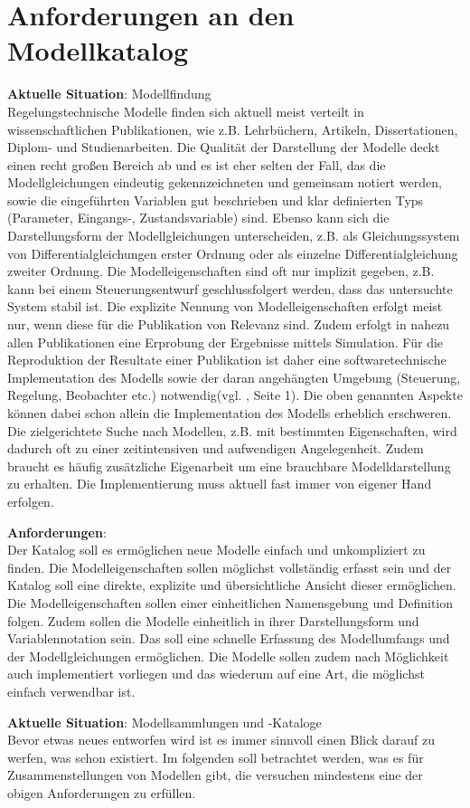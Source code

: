 \section{Anforderungen an den Modellkatalog}
\textbf{Aktuelle Situation}: Modellfindung \\
Regelungstechnische Modelle finden sich aktuell meist verteilt in wissenschaftlichen Publikationen, wie z.B. Lehrbüchern, Artikeln, Dissertationen, Diplom- und Studienarbeiten. Die Qualität der Darstellung der Modelle deckt einen recht großen Bereich ab und es ist eher selten der Fall, das die Modellgleichungen eindeutig gekennzeichneten und gemeinsam notiert werden, sowie die eingeführten Variablen gut beschrieben und klar definierten Typs (Parameter, Eingangs-, Zustandsvariable) sind. Ebenso kann sich die Darstellungsform der Modellgleichungen unterscheiden, z.B. als Gleichungssystem von Differentialgleichungen erster Ordnung oder als einzelne Differentialgleichung zweiter Ordnung. Die Modelleigenschaften sind oft nur implizit gegeben, z.B. kann bei einem Steuerungsentwurf geschlussfolgert werden, dass das untersuchte System stabil ist. Die explizite Nennung von Modelleigenschaften erfolgt meist nur, wenn diese für die Publikation von Relevanz sind. Zudem erfolgt in nahezu allen Publikationen eine Erprobung der Ergebnisse mittels Simulation. Für die Reproduktion der Resultate einer Publikation ist daher eine softwaretechnische Implementation des Modells sowie der daran angehängten Umgebung (Steuerung, Regelung, Beobachter etc.) notwendig(vgl. \cite{KNHE20}, Seite 1). Die oben genannten Aspekte können dabei schon allein die Implementation des Modells erheblich erschweren. 
Die zielgerichtete Suche nach Modellen, z.B. mit bestimmten Eigenschaften, wird dadurch oft zu einer zeitintensiven und aufwendigen Angelegenheit. Zudem braucht es häufig zusätzliche Eigenarbeit um eine brauchbare Modelldarstellung zu erhalten. Die Implementierung muss aktuell fast immer von eigener Hand erfolgen.

\textbf{Anforderungen}:\\ %
Der Katalog soll es ermöglichen neue Modelle einfach und unkompliziert zu finden. Die Modelleigenschaften sollen möglichst vollständig erfasst sein und der Katalog soll eine direkte, explizite und übersichtliche Ansicht dieser ermöglichen. Die Modelleigenschaften sollen einer einheitlichen Namensgebung und Definition folgen. Zudem sollen die Modelle einheitlich in ihrer Darstellungsform und Variablennotation sein. Das soll eine schnelle Erfassung des Modellumfangs und der Modellgleichungen ermöglichen. Die Modelle sollen zudem nach Möglichkeit auch implementiert vorliegen und das wiederum auf eine Art, die möglichst einfach verwendbar ist. 

\textbf{Aktuelle Situation}: Modellsammlungen und -Kataloge\\
Bevor etwas neues entworfen wird ist es immer sinnvoll einen Blick darauf zu werfen, was schon existiert. Im folgenden soll betrachtet werden, was es für Zusammenstellungen von Modellen gibt, die versuchen mindestens eine der obigen Anforderungen zu erfüllen. 